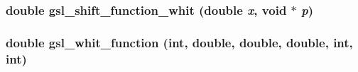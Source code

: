 \subsubsection{\setlength{\rightskip}{0pt plus 5cm}double gsl\_\-shift\_\-function\_\-whit (double {\em x}, void $\ast$ {\em p})}\label{GSL__ShftFunc_8cpp_6e45826f6d88e6594eb6c85b87d832d9}


\subsubsection{\setlength{\rightskip}{0pt plus 5cm}double gsl\_\-whit\_\-function (int, double, double, double, int, int)}\label{GSL__ShftFunc_8cpp_7b684c5ac53a6714b4091efa2bad98f9}


